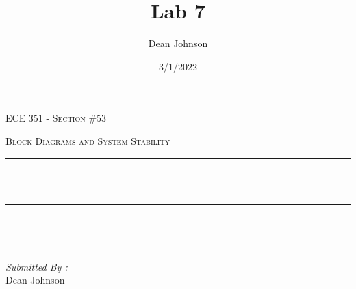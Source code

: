 \documentclass[12pt]{report}
\title{Lab 7}
\author{ Dean Johnson}
\date{3/1/2022}
\makeatletter
\let\thetitle\@title
\makeatother
\begin{document}

\begin{titlepage}
	\centering
    \vspace*{0.5 cm}
\begin{center}    \textsc{\Large   ECE 351 - Section \#53 }\\[2.0 cm]	\end{center}%
	\textsc{\Large Block Diagrams and System Stability}\\[0.5 cm]				%
	\rule{\linewidth}{0.2 mm} \\[0.4 cm]
	{ \huge \bfseries \thetitle}\\
	\rule{\linewidth}{0.2 mm} \\[1.5 cm]
	
	\begin{minipage}{0.4\textwidth}
		\begin{flushleft} \large
			\end{flushleft}
			\end{minipage}~
			\begin{minipage}{0.4\textwidth}
            
			\begin{flushright} \large
			\emph{Submitted By :} \\
			Dean Johnson  
		\end{flushright}
           
	\end{minipage}\\[2 cm]
	
    
    
    
    
	
\end{titlepage}


\tableofcontents
\pagebreak

\renewcommand{\thesection}{\arabic{section}}
\end{document}

